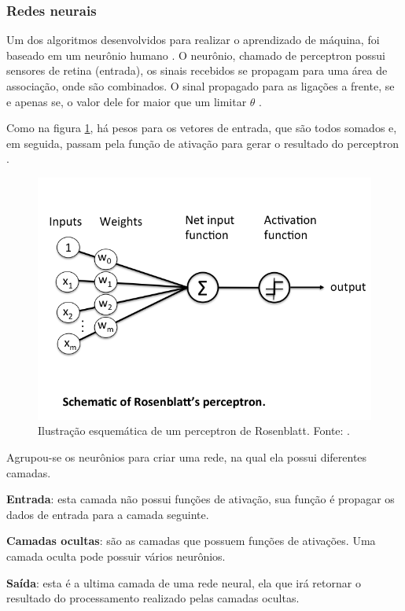 \subsubsection{Redes neurais}

Um dos algoritmos desenvolvidos para realizar o aprendizado de máquina, foi baseado em um neurônio humano \cite{goldberg_neural_2017}. O neurônio, chamado de perceptron possui sensores de retina (entrada), os sinais recebidos se propagam para uma área de associação, onde são combinados. O sinal propagado para as ligações a frente, se e apenas se, o valor dele for maior que um limitar $\theta$ \cite{raschka_single-layer_2015}.

Como na figura \ref{fig:perceptron}, há pesos para os vetores de entrada, que são todos somados e, em seguida, passam pela função de ativação para gerar o resultado do perceptron \cite{raschka_single-layer_2015}. 

\begin{figure}[ht]
	\centering
    \includegraphics[keepaspectratio=true,scale=0.5]{figuras/perceptronSchematic}
	\caption[Ilustração Perceptron]{Ilustração esquemática de um perceptron de Rosenblatt. Fonte: 
.}
	\label{fig:perceptron}
\end{figure}

Agrupou-se os neurônios para criar uma rede, na qual ela possui diferentes camadas.

\begin{description}
	\item \textbf{Entrada}: esta camada não possui funções de ativação, sua função é propagar os dados de entrada para a camada seguinte.
    \item \textbf{Camadas ocultas}: são as camadas que possuem funções de ativações. Uma camada oculta pode possuir vários neurônios.
    \item \textbf{Saída}: esta é a ultima camada de uma rede neural, ela que irá retornar o resultado do processamento realizado pelas camadas ocultas.
\end{description}

